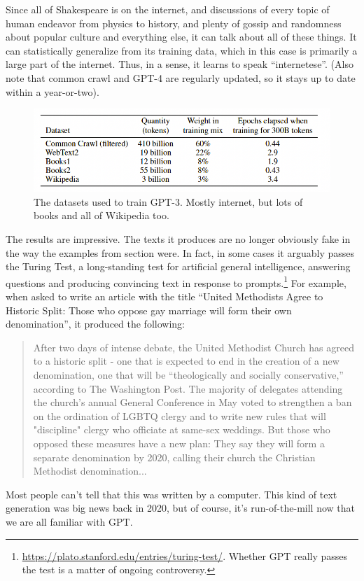 Since all of Shakespeare is on the internet, and discussions of every topic of human endeavor from physics to history, and plenty of gossip and randomness about popular culture and everything else, it can talk about all of these things.  It can statistically generalize from its training data, which in this case is primarily a large part of the internet. Thus, in a sense, it learns to speak ``internetese''.  (Also note that common crawl and GPT-4 are regularly updated, so it stays up to date within a year-or-two). 

\begin{figure}[h]
\centering
\includegraphics[scale=.4]{./images/gptDatasets}
\caption[GPT Technical report. Todo]{The datasets used to train GPT-3. Mostly internet, but lots of books and all of Wikipedia too. }
\label{gptDatasets}
\end{figure}

The results are impressive. The texts it produces are no longer obviously fake in the way the examples from section  were. In fact, in some cases it arguably passes the Turing Test, a long-standing test for artificial general intelligence, answering questions and producing convincing  text in response to prompts.\footnote{\url{https://plato.stanford.edu/entries/turing-test/}. Whether GPT really passes the test is a matter of ongoing controversy.} For example, when asked to write an article with the title ``United Methodists Agree to Historic Split: Those who oppose gay marriage will form their own denomination'', it produced the following:
\begin{quote}
After two days of intense debate, the United Methodist Church has agreed to a historic split - one that is expected to end in the creation of a new denomination, one that will be ``theologically and socially conservative,'' according to The Washington Post. The majority of delegates attending the church's annual General Conference in May voted to strengthen a ban on the ordination of LGBTQ clergy and to write new rules that will "discipline" clergy who officiate at same-sex weddings. But those who opposed these measures have a new plan: They say they will form a separate denomination by 2020, calling their church the Christian Methodist denomination...
\end{quote}
Most people can't tell that this was written by a computer.  This kind of text generation was big news back in 2020, but of course, it's run-of-the-mill now that we are all familiar with GPT.

